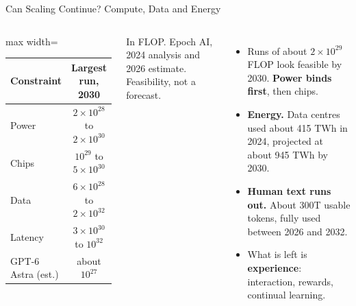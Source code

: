 \begin{frame}{Can Scaling Continue? Compute, Data and Energy}
    \begin{columns}[T,onlytextwidth]
        \centering
        \small
        \renewcommand{\arraystretch}{1.2}
        \begin{adjustbox}{max width=\linewidth}\begin{tabular}{lc}
            \toprule
            \textbf{Constraint} & \textbf{Largest run, 2030} \\
            \midrule
            Power & $2\times10^{28}$ to $2\times10^{30}$ \\
            Chips & $10^{29}$ to $5\times10^{30}$ \\
            Data & $6\times10^{28}$ to $2\times10^{32}$ \\
            Latency & $3\times10^{30}$ to $10^{32}$ \\
            \midrule
            GPT-6 Astra (est.) & about $10^{27}$ \\
            \bottomrule
        \end{tabular}\end{adjustbox}

        \vspace{0.4em}
        {\scriptsize In FLOP. Epoch AI, 2024 analysis and 2026 estimate. Feasibility, not a forecast.}
        \begin{itemize}\itemsep0.45em
            \item Runs of about $2\times10^{29}$ FLOP look feasible by 2030. \textbf{Power binds first}, then chips.
            \item \textbf{Energy.} Data centres used about 415 TWh in 2024, projected at about 945 TWh by 2030.
            \item \textbf{Human text runs out.} About 300T usable tokens, fully used between 2026 and 2032.
            \item What is left is \textbf{experience}: interaction, rewards, continual learning.
        \end{itemize}
    \end{columns}
    \vspace{0.2em}
\end{frame}

